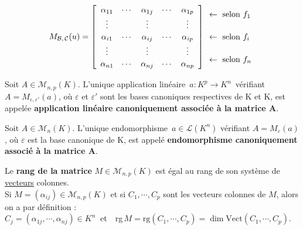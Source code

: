 \[ M_{\mathcal{B},\,\mathcal{C}}(u)=\left[\begin{array}{ccccc}
    \alpha_{11} & \cdots & \alpha_{1j} & \cdots & \alpha_{1p} \\
    \vdots & & \vdots & & \vdots \\
    \alpha_{i1} & \cdots & \alpha_{ij} & \cdots & \alpha_{ip} \\
    \vdots & & \vdots & & \vdots \\
    \alpha_{n1} & \cdots & \alpha_{nj} & \cdots & \alpha_{np} \\
\end{array} \right] 
\def\arraystretch{1.15} \begin{array}{l}
    \leftarrow \text{ selon } f_1 \\
    \\
    \leftarrow \text{ selon } f_i \\
    \\
    \leftarrow \text{ selon } f_n \\
\end{array}\]

\vspace{1.5cm}

Soit \(A\in \mathcal{M}_{n,p}(K)\). L'unique application linéaire \(\,a:K^p\to K^n\,\) vérifiant \(A=M_{\varepsilon,\varepsilon'}(a)\), où \(\varepsilon\) et \(\varepsilon'\) sont les bases canoniques respectives de K et K, est appelée \textbf{application linéaire canoniquement associée à la matrice A}.\vspace{0.2cm}

Soit \(A\in \mathcal{M}_n(K)\). L'unique endomorphisme \(\,a\in \mathscr{L}(K^n) \) vérifiant \(A=M_{\varepsilon}(a)\), où \(\varepsilon\) est la base canonique de K, est appelé \textbf{endomorphisme canoniquement associé à la matrice A}.

\vspace{1.3cm}

Le \textbf{rang de la matrice} \(M\in \mathcal{M}_{n,p}(K)\) est égal au rang de son système de \underline{vecteurs} colonnes.\vspace{0.1cm}\\
Si \(M=(\alpha_{ij})\in \mathcal{M}_{n,p}(K)\) et si \(C_1,\cdots, C_p\) sont les vecteurs colonnes de $M$, alors on a par définition :\vspace{0.1cm}\\
\(C_j=(\alpha_{1j},\cdots,\alpha_{nj})\in K^n\ \) et\ \, rg\(\,M=\text{rg}(C_1,\cdots,C_p)=\dim \text{Vect}(C_1,\cdots,C_p)\). 


